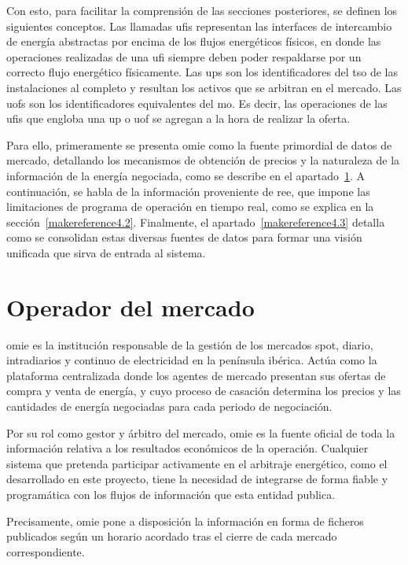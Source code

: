 Con esto, para facilitar la comprensión de las secciones posteriores, se definen los siguientes conceptos. Las llamadas \glspl{ufi} representan las interfaces de intercambio de energía abstractas por encima de los flujos energéticos físicos, en donde las operaciones realizadas de una \gls{ufi} siempre deben poder respaldarse por un correcto flujo energético físicamente. Las \glspl{up} son los identificadores del \gls{tso} de las instalaciones al completo y resultan los activos que se arbitran en el mercado. Las \glspl{uof} son los identificadores equivalentes del \gls{mo}. Es decir, las operaciones de las \glspl{ufi} que engloba una \gls{up} o \gls{uof} se agregan a la hora de realizar la oferta.

Para ello, primeramente se presenta \gls{omie} como la fuente primordial de datos de mercado, detallando los mecanismos de obtención de precios y la naturaleza de la información de la energía negociada, como se describe en el apartado~\ref{makereference4.1}. A continuación, se habla de la información proveniente de \gls{ree}, que impone las limitaciones de programa de operación en tiempo real, como se explica en la sección~\ref{makereference4.2}. Finalmente, el apartado~\ref{makereference4.3} detalla como se consolidan estas diversas fuentes de datos para formar una visión unificada que sirva de entrada al sistema.

\section{Operador del mercado}
\label{makereference4.1}

\Gls{omie} es la institución responsable de la gestión de los mercados spot, diario, intradiarios y continuo de electricidad en la península ibérica. Actúa como la plataforma centralizada donde los agentes de mercado presentan sus ofertas de compra y venta de energía, y cuyo proceso de casación determina los precios y las cantidades de energía negociadas para cada periodo de negociación.

Por su rol como gestor y árbitro del mercado, \gls{omie} es la fuente oficial de toda la información relativa a los resultados económicos de la operación. Cualquier sistema que pretenda participar activamente en el arbitraje energético, como el desarrollado en este proyecto, tiene la necesidad de integrarse de forma fiable y programática con los flujos de información que esta entidad publica.

Precisamente, \gls{omie} pone a disposición la información en forma de ficheros publicados según un horario acordado tras el cierre de cada mercado correspondiente.

